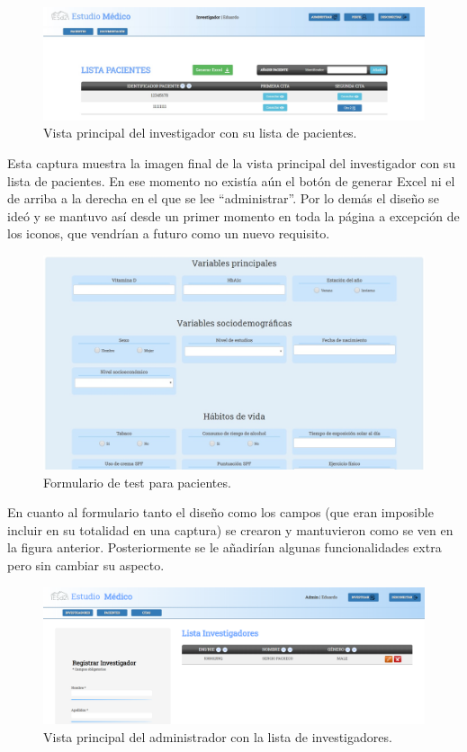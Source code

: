  \begin{figure}[h]
    \centering
     \includegraphics[width=1\textwidth]{images/investigadorPacientes.jpg}
    \caption{Vista principal del investigador con su lista de pacientes.}
\end{figure}

Esta captura muestra la imagen final de la vista principal del investigador con su lista de pacientes. En ese momento no existía aún el botón de generar Excel ni el de arriba a la derecha en el que se lee ``administrar''. Por lo demás el diseño se ideó y se mantuvo así desde un primer momento en toda la página a excepción de los iconos, que vendrían a futuro como un nuevo requisito.

\begin{figure}[h]
    \centering
     \includegraphics[width=1\textwidth]{images/testPacientes.jpg}
    \caption{Formulario de test para pacientes.}
\end{figure}

En cuanto al formulario tanto el diseño como los campos (que eran imposible incluir en su totalidad en una captura) se crearon y mantuvieron como se ven en la figura anterior. Posteriormente se le añadirían algunas funcionalidades extra pero sin cambiar su aspecto.
\newpage

\begin{figure}[h]
    \centering
     \includegraphics[width=1\textwidth]{images/adminInvestigadores.png}
    \caption{Vista principal del administrador con la lista de investigadores.}
\end{figure}


